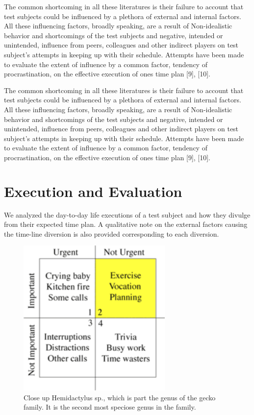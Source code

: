 \documentclass[conference]{IEEEtran}
\begin{document}
The common shortcoming in all these literatures is their failure to account that test subjects could be influenced by a plethora of external and internal factors. All these influencing factors, broadly speaking, are a result of Non-idealistic behavior and shortcomings of the test subjects and negative, intended or unintended, influence from peers, colleagues and other indirect players on test subject's attempts in keeping up with their schedule. Attempts have been made to evaluate the extent of influence by a common factor, tendency of procrastination, on the effective execution of ones time plan [9], [10]. 

The common shortcoming in all these literatures is their failure to account that test subjects could be influenced by a plethora of external and internal factors. All these influencing factors, broadly speaking, are a result of Non-idealistic behavior and shortcomings of the test subjects and negative, intended or unintended, influence from peers, colleagues and other indirect players on test subject's attempts in keeping up with their schedule. Attempts have been made to evaluate the extent of influence by a common factor, tendency of procrastination, on the effective execution of ones time plan [9], [10]. 

\section{Execution and Evaluation}
We analyzed the day-to-day life executions of a test subject and how they divulge from their expected time plan. A qualitative note on the external factors causing the time-line diversion is also provided corresponding to each diversion.

\begin{figure}[hb]
  \centering
  \includegraphics[width=3in]{figure1}
  \caption[]
   {Close up Hemidactylus sp., which is
   part the genus of the gecko family. It is the
   second most speciose genus in the family.}
\end{figure}
\end{document}
